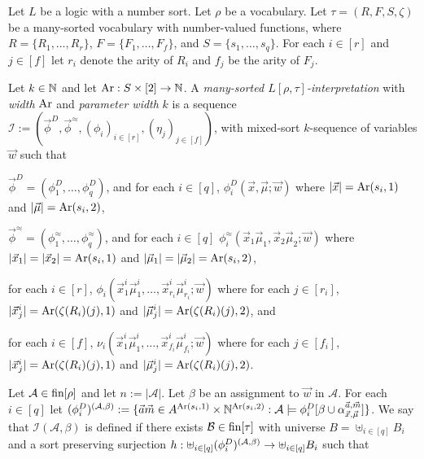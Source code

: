 \documentclass[../main/thesis.tex]{subfiles}
\begin{document}
\begin{definition}
  Let $L$ be a logic with a number sort. Let $\rho$ be a vocabulary. Let $\tau =
  (R, F, S, \zeta)$ be a many-sorted vocabulary with number-valued functions,
  where $R = \{R_1, \ldots, R_{r}\}$, $F = \{ F_1, \ldots, F_{f} \}$, and $S =
  \{s_1, \ldots, s_{q}\}$. For each $i \in [r]$ and $j \in [f]$ let $r_i$ denote
  the arity of $R_i$ and $f_j$ be the arity of $F_j$.

  Let $k \in \mathbb{N}$ and let $\text{\upshape Ar} : S \times [2] \rightarrow \mathbb{N}$. A \emph{many-sorted
    $L [\rho, \tau]$-interpretation} with \emph{width} $\text{\upshape Ar}$ and \emph{parameter
    width} $k$ is a sequence $\mathcal{I} := (\vec{\phi}^D,
  \vec{\phi}^{\approx}, (\phi_i)_{i \in [r]}, (\eta_j)_{j \in [f]})$, with
  mixed-sort $k$-sequence of variables $\vec{w}$ such that

  \begin{myenum}
  \item $\vec{\phi}^D = (\phi^D_1, \ldots, \phi^D_q)$, and for each $i \in [q]$,
    $\phi^D_i(\vec{x}, \vec{\mu}; \vec{w})$ where $\vert \vec{x} \vert =
    \text{\upshape Ar}(s_i, 1)$ and $\vert \vec{\mu} \vert = \text{\upshape Ar}(s_i, 2)$,
  \item $\vec{\phi}^{\approx} = (\phi^{\approx}_1, \ldots, \phi^{\approx}_q)$,
    and for each $i \in [q]$ $\phi^{\approx}_i(\vec{x}_1\vec{\mu}_1, \vec{x}_2
    \vec{\mu}_2 ; \vec{w})$ where $\vert \vec{x}_1 \vert = \vert \vec{x}_2 \vert
    = \text{\upshape Ar}(s_i, 1)$ and $\vert \vec{\mu}_1 \vert = \vert \vec{\mu}_2 \vert =
    \text{\upshape Ar}(s_i, 2)$,
  \item for each $i \in [r]$, $\phi_i (\vec{x}^i_1 \vec{\mu}^i_1, \ldots,
    \vec{x}^{i}_{r_i} \vec{\mu}^{i}_{r_i} ; \vec{w})$ where for each $j \in
    [r_i]$, $\vert \vec{x}^i_j\vert = \text{\upshape Ar}(\zeta(R_i)(j), 1)$ and $\vert
    \vec{\mu}^i_j \vert = \text{\upshape Ar}(\zeta(R_i)(j), 2)$, and
  \item for each $i \in [f]$, $\nu_i (\vec{x}^i_1 \vec{\mu}^i_1, \ldots,
    \vec{x}^{i}_{f_i} \vec{\mu}^{i}_{f_i} ; \vec{w})$ where for each $j \in
    [f_i]$, $\vert \vec{x}^i_j \vert = \text{\upshape Ar}(\zeta(R_i)(j), 1)$ and $\vert
    \vec{\mu}^i_j \vert = \text{\upshape Ar}(\zeta(R_i)(j), 2)$.
  \end{myenum}

  Let $\mathcal{A} \in \text{\upshape fin}[\rho]$ and let $n := \vert \mathcal{A} \vert$. Let
  $\beta$ be an assignment to $\vec{w}$ in $\mathcal{A}$. For each $i \in [q]$
  let $(\phi^D_i)^{(\mathcal{A}, \beta)} := \{ \vec{a}\vec{m} \in A^{\text{\upshape Ar}(s_i,
    1)} \times \mathbb{N}^{\text{\upshape Ar}(s_i, 2)}: \mathcal{A} \models \phi^D_i[\beta \cup
  \alpha^{\vec{a}, \vec{m}}_{\vec{x}, \vec{\mu}}] \}$. We say that $\mathcal{I}
  (\mathcal{A}, \beta)$ is defined if there exists $\mathcal{B} \in \text{\upshape fin}[\tau]$
  with universe $B = \uplus_{i \in [q]} B_i$ and a sort preserving surjection $h
  : \uplus_{i \in [q]} (\phi^D_i)^{(\mathcal{A}, \beta)} \rightarrow \uplus_{i \in [q]}
  B_i$ such that
    

\end{definition}
\end{document}
